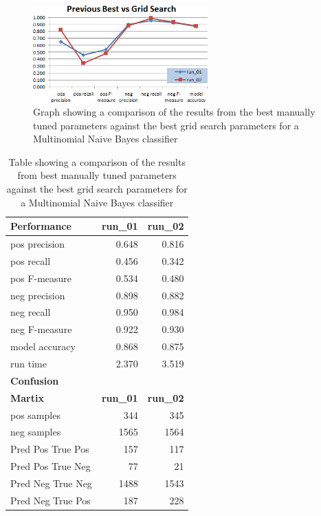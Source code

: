 \begin{figure}[htbp]
	\centering
	\includegraphics[width=0.6\textwidth]{Figures/Chapter5/scikit_process_chart_03.jpg}
	\caption[Scikit-Learn comparing best manual results with grid search results]{Graph showing a comparison of the results from the best manually tuned parameters against the best grid search parameters for a Multinomial Naive Bayes classifier}
	\label{fig:scikit_process_chart_03}
\end{figure}

\begin{table}[h]
	\centering
	\caption[Grid search performance and confusion matrix comparison]{Table showing a comparison of the results from best manually tuned parameters against the best grid search parameters for a Multinomial Naive Bayes classifier}
	\label{tab:chapter5:grid_search_01}
	\begin{tabular}{lrr}
		\toprule
		\textbf{Performance}& \textbf{run\_01}  & \textbf{run\_02}   \\
		\midrule
		pos precision & 0.648 & 0.816  \\
		pos recall & 0.456 & 0.342  \\
		pos F-measure & 0.534 & 0.480  \\
		neg precision & 0.898 & 0.882  \\
		neg recall & 0.950 & 0.984  \\
		neg F-measure & 0.922 & 0.930  \\
		model accuracy & 0.868 & 0.875  \\
		run time & 2.370 & 3.519  \\
		\midrule
		\textbf{Confusion} &  &   \\
		\textbf{Martix} & \textbf{run\_01} & \textbf{run\_02}  \\
		\midrule
		pos samples & 344 & 345  \\
		neg samples & 1565 & 1564  \\
		Pred Pos True Pos & 157 & 117  \\
		Pred Pos True Neg & 77 & 21  \\
		Pred Neg True Neg & 1488 & 1543  \\
		Pred Neg True Pos & 187 & 228  \\		
		\bottomrule
    \end{tabular}
\end{table}

